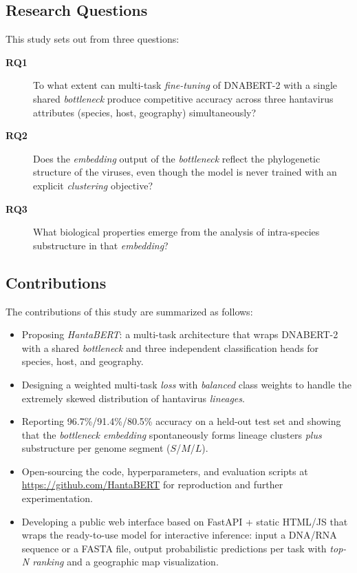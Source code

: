 \documentclass[conference]{IEEEtran}
\begin{document}
\subsection{Research Questions}

This study sets out from three questions:
\begin{description}
  \item[\textbf{RQ1}] To what extent can multi-task \emph{fine-tuning} of
        DNABERT-2 with a single shared \emph{bottleneck} produce
        competitive accuracy across three hantavirus attributes (species,
        host, geography) simultaneously?
  \item[\textbf{RQ2}] Does the \emph{embedding} output of the
        \emph{bottleneck} reflect the phylogenetic structure of the
        viruses, even though the model is never trained with an explicit
        \emph{clustering} objective?
  \item[\textbf{RQ3}] What biological properties emerge from the analysis
        of intra-species substructure in that \emph{embedding}?
\end{description}

\subsection{Contributions}

The contributions of this study are summarized as follows:
\begin{itemize}
  \item Proposing \emph{HantaBERT}: a multi-task architecture that wraps
        DNABERT-2 with a shared \emph{bottleneck} and three independent
        classification heads for species, host, and geography.
  \item Designing a weighted multi-task \emph{loss} with \emph{balanced}
        class weights to handle the extremely skewed distribution of
        hantavirus \emph{lineages}.
  \item Reporting 96{.}7\%/91{.}4\%/80{.}5\% accuracy on a held-out test
        set and showing that the \emph{bottleneck embedding}
        spontaneously forms lineage clusters \emph{plus} substructure per
        genome segment ($S$/$M$/$L$).
  \item Open-sourcing the code, hyperparameters, and evaluation scripts at
        \url{https://github.com/HantaBERT} for reproduction and further
        experimentation.
  \item Developing a public web interface based on FastAPI + static
        HTML/JS that wraps the ready-to-use model for interactive
        inference: input a DNA/RNA sequence or a FASTA file, output
        probabilistic predictions per task with \emph{top-N ranking}
        and a geographic map visualization.
\end{itemize}
\end{document}
